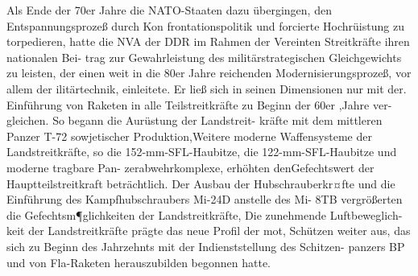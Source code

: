 

Als Ende der 70er Jahre die NATO-Staaten dazu
übergingen, den Entspannungsprozeß durch Kon
frontationspolitik und forcierte Hochrüistung zu
torpedieren, hatte die NVA der DDR im Rahmen
der Vereinten Streitkräfte ihren nationalen Bei-
trag zur Gewahrleistung des militärstrategischen
Gleichgewichts zu leisten, der einen weit in die 80er
Jahre reichenden Modernisierungsprozeß, vor allem
der ilitärtechnik, einleitete. Er ließ sich in seinen
Dimensionen nur mit der. Einführung von Raketen
in alle Teilstreitkräfte zu Beginn der 60er ,Jahre ver-
gleichen. So begann die Aurüstung der Landstreit-
kräfte mit dem mittleren Panzer T-72 sowjetischer
Produktion,Weitere moderne Waffensysteme der
Landstreitkräfte, so die 152-mm-SFL-Haubitze, die
122-mm-SFL-Haubitze und moderne tragbare Pan-
zerabwehrkomplexe, erhöhten denGefechtswert
der Hauptteilstreitkraft beträchtlich. Der Ausbau
der Hubschrauberkr¤fte und die Einführung des
Kampfhubschraubers Mi-24D anstelle des Mi-
8TB vergrößerten die Gefechtsm¶glichkeiten der
Landstreitkräfte, Die zunehmende Luftbeweglich-
keit der Landstreitkräfte prägte das neue Profil der
mot, Schützen weiter aus, das sich zu Beginn des
Jahrzehnts mit der Indienststellung des Schitzen-
panzers BP und von Fla-Raketen herauszubilden
begonnen hatte.

